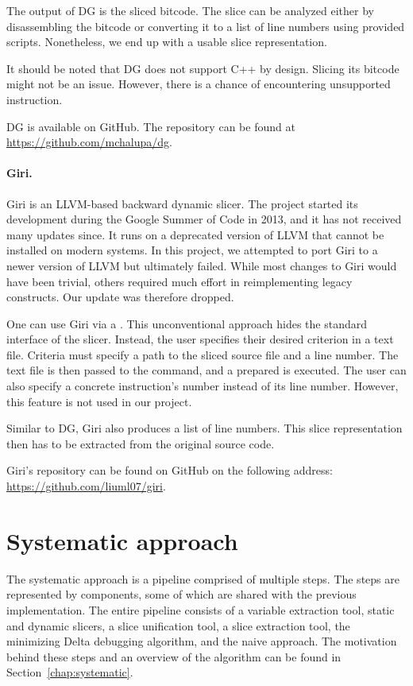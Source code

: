 The output of DG is the sliced bitcode. 
The slice can be analyzed either by disassembling the bitcode or converting 
it to a list of line numbers using provided scripts. 
Nonetheless, we end up with a usable slice representation.

It should be noted that DG does not support C++ by design. 
Slicing its bitcode might not be an issue. 
However, there is a chance of encountering unsupported instruction.

DG is available on GitHub. 
The repository can be found at \url{https://github.com/mchalupa/dg}.

\paragraph{Giri.}

Giri is an LLVM-based backward dynamic slicer. 
The project started its development during the Google Summer of Code in 2013, 
and it has not received many updates since. 
It runs on a deprecated version of LLVM that cannot be installed on modern 
systems. 
In this project, we attempted to port Giri to a newer version of LLVM but 
ultimately failed. 
While most changes to Giri would have been trivial, others required much 
effort in reimplementing legacy constructs. 
Our update was therefore dropped.

One can use Giri via a . 
This unconventional approach hides the standard interface of the slicer. 
Instead, the user specifies their desired criterion in a text file. 
Criteria must specify a path to the sliced source file and a line number. 
The text file is then passed to the  command, and a prepared 
 is executed. 
The user can also specify a concrete instruction's number instead of its 
line number. 
However, this feature is not used in our project.

Similar to DG, Giri also produces a list of line numbers. 
This slice representation then has to be extracted from the original source 
code.

Giri's repository can be found on GitHub on the following address: 
\url{https://github.com/liuml07/giri}.

\section{Systematic approach}

The systematic approach is a pipeline comprised of multiple steps. 
The steps are represented by components, some of which are shared with 
the previous implementation. 
The entire pipeline consists of a variable extraction tool, static and 
dynamic slicers, a slice unification tool, a slice extraction tool, 
the minimizing Delta debugging algorithm, and the naive approach. 
The motivation behind these steps and an overview of the algorithm can be 
found in Section~\ref{chap:systematic}.

